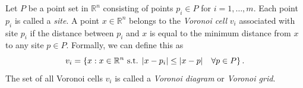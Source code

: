 \begin{definition}
\label{def:voronoi}
Let $P$ be a point set in $\mathbb{R}^n$ consisting of points $p_i \in P$ for $i = 1,\dots,m$. Each point $p_i$ is called a \emph{site}. A point $x \in \mathbb{R}^n$ belongs to the \emph{Voronoi cell} $v_i$ associated with site $p_i$ if the distance between $p_i$ and $x$ is equal to the minimum distance from $x$ to any site $p \in P$. Formally, we can define this as
\begin{equation}
    v_i = \left\{ x : x \in \mathbb{R}^n \text{ s.t. } \lvert x - p_i\rvert \leq \lvert x - p\rvert\quad \forall p \in P \right\}.
\end{equation}
The set of all Voronoi cells $v_i$ is called a \emph{Voronoi diagram} or \emph{Voronoi grid}.
\end{definition}

